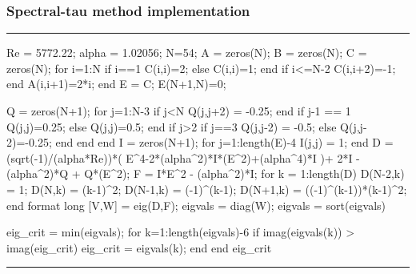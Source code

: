 \documentclass[a4paper, 12pt, twoside, openright]{article}
\numberwithin{equation}{section}
\begin{document}
\subsubsection{Spectral-tau method implementation}
\begin{center}
\rule{\linewidth}{1.5pt}
\end{center}
\begin{spverbatim}
Re = 5772.22; %
alpha = 1.02056; %
N=54; %
A = zeros(N);
B = zeros(N);
C = zeros(N);
for i=1:N
    if i==1
        C(i,i)=2;
    else 
        C(i,i)=1;
    end
    if i<=N-2
        C(i,i+2)=-1;  
    end
    A(i,i+1)=2*i;
end
E = C\A;
E(N+1,N)=0; %

Q = zeros(N+1); %
for j=1:N-3
    if j<N
        Q(j,j+2) = -0.25;
    end
    if j-1 == 1
        Q(j,j)=0.25;
    else
        Q(j,j)=0.5;
    end        
    if j>2
        if j==3
            Q(j,j-2) = -0.5;
        else
            Q(j,j-2)=-0.25;
        end
    end
end
I = zeros(N+1);
for j=1:length(E)-4
   I(j,j) = 1; 
end
D = (sqrt(-1)/(alpha*Re))*( E^4-2*(alpha^2)*I*(E^2)+(alpha^4)*I )+ 2*I - 
(alpha^2)*Q + Q*(E^2); %
F = I*E^2 - (alpha^2)*I; %
for k = 1:length(D)
   D(N-2,k) = 1; %
   D(N,k) = (k-1)^2; %
   D(N-1,k) = (-1)^(k-1); %
   D(N+1,k) = ((-1)^(k-1))*(k-1)^2; %
end
format long
[V,W] = eig(D,F); %
eigvals = diag(W);
eigvals = sort(eigvals) %

eig_crit = min(eigvals);
for k=1:length(eigvals)-6 %
    if imag(eigvals(k)) > imag(eig_crit)
        eig_crit = eigvals(k);
    end
end
eig_crit %
\end{spverbatim}
\begin{center}
\rule{\linewidth}{1.5pt}
\end{center}
\end{document}
